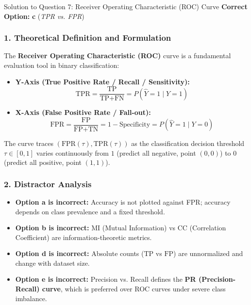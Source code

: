 \documentclass[11pt,a4paper]{article}
\begin{document}
\begin{solutionbox}{Solution to Question 7: Receiver Operating Characteristic (ROC) Curve}
\textbf{Correct Option:} \textbf{c} (\textit{TPR vs. FPR})

\subsubsection*{1. Theoretical Definition and Formulation}
The \textbf{Receiver Operating Characteristic (ROC)} curve is a fundamental evaluation tool in binary classification:
\begin{itemize}[itemsep=2pt]
    \item \textbf{Y-Axis (True Positive Rate / Recall / Sensitivity):}
    \begin{equation}
        \text{TPR} = \frac{\text{TP}}{\text{TP} + \text{FN}} = P(\hat{Y}=1 \mid Y=1)
    \end{equation}
    \item \textbf{X-Axis (False Positive Rate / Fall-out):}
    \begin{equation}
        \text{FPR} = \frac{\text{FP}}{\text{FP} + \text{TN}} = 1 - \text{Specificity} = P(\hat{Y}=1 \mid Y=0)
    \end{equation}
\end{itemize}
The curve traces $(\text{FPR}(\tau), \text{TPR}(\tau))$ as the classification decision threshold $\tau \in [0, 1]$ varies continuously from $1$ (predict all negative, point $(0,0)$) to $0$ (predict all positive, point $(1,1)$).

\subsubsection*{2. Distractor Analysis}
\begin{itemize}[itemsep=2pt]
    \item \textbf{Option a is incorrect:} Accuracy is not plotted against FPR; accuracy depends on class prevalence and a fixed threshold.
    \item \textbf{Option b is incorrect:} MI (Mutual Information) vs CC (Correlation Coefficient) are information-theoretic metrics.
    \item \textbf{Option d is incorrect:} Absolute counts ($\text{TP}$ vs $\text{FP}$) are unnormalized and change with dataset size.
    \item \textbf{Option e is incorrect:} Precision vs. Recall defines the \textbf{PR (Precision-Recall) curve}, which is preferred over ROC curves under severe class imbalance.
\end{itemize}
\end{solutionbox}
\end{document}
